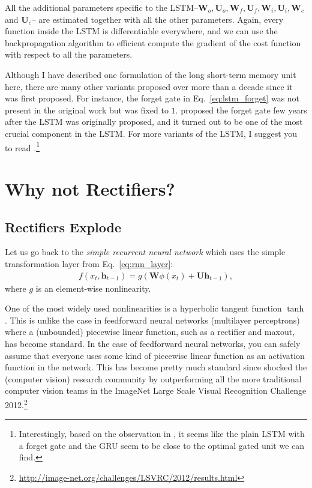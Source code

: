 \documentclass{report}
\newcommand{\vect}[1]{\mathbf{#1}}
\newcommand{\matr}[1]{\mathbf{#1}}
\newcommand{\vh}[0]{\vect{h}}
\newcommand{\mW}[0]{\matr{W}}
\newcommand{\mU}[0]{\matr{U}}
\begin{document}
All the additional parameters specific to the
LSTM--$\mW_o,\mU_o,\mW_f,\mU_f,\mW_i,\mU_i,\mW_c$ and $\mU_c$-- are estimated
together with all the other parameters. Again, every function inside the LSTM is
differentiable everywhere, and we can use the backpropagation algorithm to
efficient compute the gradient of the cost function with respect to all the
parameters.

Although I have described one formulation of the long short-term memory unit
here, there are many other variants proposed over more than a decade since it
was first proposed. For instance, the forget gate in Eq.~\eqref{eq:lstm_forget}
was not present in the original work \citep{hochreiter1997long} but was fixed to
$1$. \citet{gers2000learning} proposed the forget gate few years
after the LSTM was originally proposed, and it turned out to be one of the most
crucial component in the LSTM. For more variants of the LSTM, I suggest you to
read \citet{greff2015lstm,jozefowicz2015empirical}.\footnote{
    Interestingly, based on the observation in \citet{jozefowicz2015empirical},
    it seems like the plain LSTM with a forget gate and the GRU seem to be close
    to the optimal gated unit we can find. 
}

\section{Why not Rectifiers?}

\subsection{Rectifiers Explode}
\label{sec:rect_explode}

Let us go back to the {\em simple recurrent neural network} which uses the
simple transformation layer from Eq.~\eqref{eq:rnn_layer}:
\begin{align*}
    f(x_t, \vh_{t-1}) = g(\mW \phi(x_t) + \mU \vh_{t-1}),
\end{align*}
where $g$ is an element-wise nonlinearity. 

One of the most widely used nonlinearities is a hyperbolic tangent function
$\tanh$. This is unlike the case in feedforward neural networks (multilayer
perceptrons) where a (unbounded) piecewise linear function, such as a rectifier
and maxout, has become standard. In the case of feedforward neural networks, you
can safely assume that everyone uses some kind of piecewise linear function as
an activation function in the network. This has become pretty much standard
since \citet{krizhevsky2012imagenet} shocked the (computer
vision) research community by outperforming all the more traditional computer
vision teams in the ImageNet Large Scale Visual Recognition Challenge
2012.\footnote{
    \url{http://image-net.org/challenges/LSVRC/2012/results.html}
}
\end{document}
